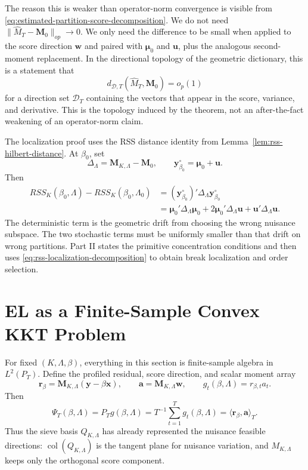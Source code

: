 \documentclass[12pt]{article}
\numberwithin{equation}{section}
\theoremstyle{definition}
\newcommand{\LtwoT}{L^2(P_T)}
\newcommand{\innerT}[2]{\langle #1,#2\rangle_T}
\begin{document}
The reason this is weaker than operator-norm convergence is visible from
\eqref{eq:estimated-partition-score-decomposition}. We do not need
\(\|\widehat M_T-\bm M_0\|_{op}\to0\). We only need the difference to be small
when applied to the score direction \(\bm w\) and paired with \(\bm\mu_0\) and
\(\bm u\), plus the analogous second-moment replacement. In the directional
topology of the geometric dictionary, this is a statement that
\[
    d_{\mathcal D,T}(\widehat M_T,\bm M_0)=o_p(1)
\]
for a direction set \(\mathcal D_T\) containing the vectors that appear in the
score, variance, and derivative. This is the topology induced by the theorem,
not an after-the-fact weakening of an operator-norm claim.

The localization proof uses the RSS distance identity from
Lemma~\ref{lem:rss-hilbert-distance}. At \(\beta_0\), set
\[
    \Delta_\Lambda=\bm M_{K,\Lambda}-\bm M_0,
    \qquad
    \bm y_{\beta_0}^\circ=\bm\mu_0+\bm u.
\]
Then
\begin{equation}
\begin{aligned}
    RSS_K(\beta_0,\Lambda)-RSS_K(\beta_0,\Lambda_0)
    &=(\bm y_{\beta_0}^\circ)'\Delta_\Lambda\bm y_{\beta_0}^\circ \\
    &=\bm\mu_0'\Delta_\Lambda\bm\mu_0
      +2\bm\mu_0'\Delta_\Lambda\bm u
      +\bm u'\Delta_\Lambda\bm u.
\end{aligned}
\label{eq:rss-localization-decomposition}
\end{equation}
The deterministic term is the geometric drift from choosing the wrong nuisance
subspace. The two stochastic terms must be uniformly smaller than that drift on
wrong partitions. Part II states the primitive concentration conditions and then
uses \eqref{eq:rss-localization-decomposition} to obtain break localization and
order selection.
\section{EL as a Finite-Sample Convex KKT Problem}

For fixed \((K,\Lambda,\beta)\), everything in this section is finite-sample
algebra in \(\LtwoT\). Define the profiled residual, score direction, and scalar
moment array
\[
    \bm r_\beta=\bm M_{K,\Lambda}(\bm y-\beta\bm x),
    \qquad
    \bm a=\bm M_{K,\Lambda}\bm w,
    \qquad
    g_t(\beta,\Lambda)=r_{\beta,t}a_t.
\]
Then
\[
    \Psi_T(\beta,\Lambda)=P_Tg(\beta,\Lambda)
    =T^{-1}\sum_{t=1}^Tg_t(\beta,\Lambda)
    =\innerT{\bm r_\beta}{\bm a}.
\]
Thus the sieve basis \(Q_{K,\Lambda}\) has already represented the nuisance
feasible directions: \(\operatorname{col}(Q_{K,\Lambda})\) is the tangent plane
for nuisance variation, and \(M_{K,\Lambda}\) keeps only the orthogonal score
component.
\end{document}
